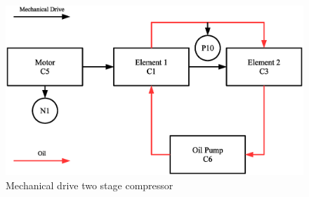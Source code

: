\begin{figure}
\includegraphics[width = \textwidth]{./Images/MechanicalCompressor.eps}
\caption{Mechanical drive two stage compressor}
\label{fig:mechcompressor}
\end{figure}

